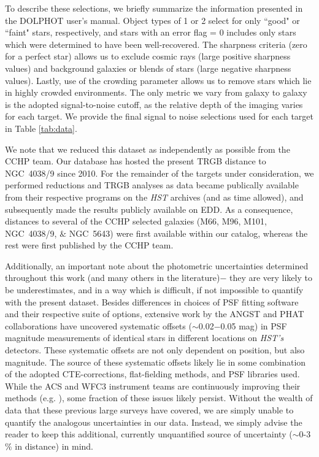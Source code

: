 \documentclass[twocolumn]{aastex62}
\begin{document}
To describe these selections, we briefly summarize the information presented in the DOLPHOT user's manual. Object types of 1 or 2 select for only ``good" or ``faint" stars, respectively, and stars with an error flag = 0 includes only stars which were determined to have been well-recovered. The sharpness criteria (zero for a perfect star) allows us to exclude cosmic rays (large positive sharpness values) and background galaxies or blends of stars (large negative sharpness values). Lastly, use of the crowding parameter allows us to remove stars which lie in highly crowded environments. The only metric we vary from galaxy to galaxy is the adopted signal-to-noise cutoff, as the relative depth of the imaging varies for each target. We provide the final signal to noise selections used for each target in Table \ref{tab:data}.  

We note that we reduced this dataset as independently as possible from the CCHP team. Our database has hosted the present TRGB distance to NGC~4038/9 since 2010. For the remainder of the targets under consideration, we performed reductions and TRGB analyses as data became publically available from their respective programs on the \textit{HST} archives (and as time allowed), and subsequently made the results publicly available on EDD. As a consequence, distances to several of the CCHP selected galaxies (M66, M96, M101, NGC~4038/9, $\&$ NGC~5643) were first available within our catalog, whereas the rest were first published by the CCHP team. 

Additionally, an important note about the photometric uncertainties determined throughout this work (and many others in the literature)$-$ they are very likely to be underestimates, and in a way which is difficult, if not impossible to quantify with the present dataset. Besides differences in choices of PSF fitting software and their respective suite of options, extensive work by the ANGST and PHAT collaborations \citep{2009ApJS..183...67D, 2012ApJS..200...18D, 2014ApJS..215....9W} have uncovered systematic offsets ($\sim$0.02$-$0.05 mag) in PSF magnitude measurements of identical stars in different locations on \textit{HST's} detectors. These systematic offsets are not only dependent on position, but also magnitude. The source of these systematic offsets likely lie in some combination of the adopted CTE-corrections, flat-fielding methods, and PSF libraries used. While the ACS and WFC3 instrument teams are continuously improving their methods (e.g. \citealt{2017acs..rept....2H, 2018acs..rept....4A, 2018wfc..rept...14A}), some fraction of these issues likely persist. Without the wealth of data that these previous large surveys have covered, we are simply unable to quantify the analogous uncertainties in our data. Instead, we simply advise the reader to keep this additional, currently unquantified source of uncertainty ($\sim$0-3$\%$ in distance) in mind.
\end{document}
